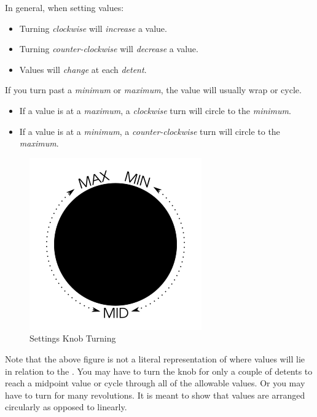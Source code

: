 \par\medskip

In general, when setting values:

\begin{itemize}
  \item Turning \textit{clockwise} will \textit{increase} a value.
  \item Turning \textit{counter-clockwise} will \textit{decrease} a value.
  \item Values will \textit{change} at each \textit{detent}.
\end{itemize}

If you turn past a \textit{minimum} or \textit{maximum}, the value will usually
wrap or cycle.

\begin{itemize}
  \item If a value is at a \textit{maximum}, a \textit{clockwise} turn will
    circle to the \textit{minimum}.
  \item If a value is at a \textit{minimum}, a \textit{counter-clockwise} turn
    will circle to the \textit{maximum}.
\end{itemize}

\begin{figure}[H]
\centering
  \includegraphics{images/settings_knob_wrap.png}
\caption{Settings Knob Turning}
\end{figure}

Note that the above figure is not a literal representation of where values will
lie in relation to the .  You may have to turn the knob for only a couple
of detents to reach a midpoint value or cycle through all of the allowable
values.  Or you may have to turn for many revolutions.  It is meant to show that
values are arranged circularly as opposed to linearly.

